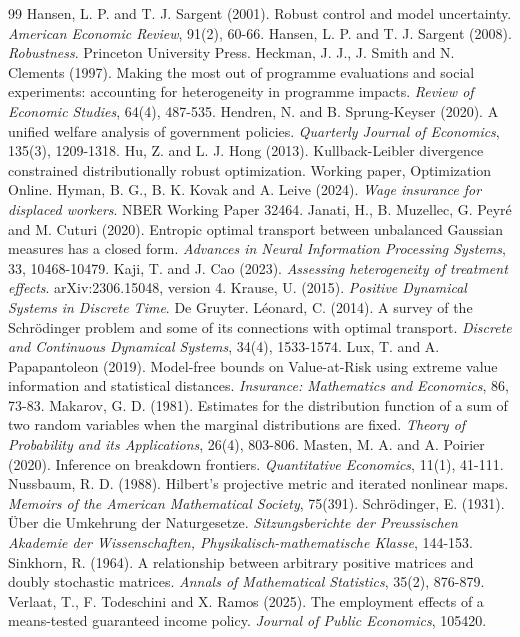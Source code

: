 \documentclass[11pt,a4paper]{article}
\theoremstyle{notesplain}
\theoremstyle{notesupright}
\numberwithin{equation}{section}
\begin{document}
\begin{thebibliography}{99}
 Hansen, L. P. and T. J. Sargent (2001). Robust control and model uncertainty. \emph{American Economic Review}, 91(2), 60-66.
 Hansen, L. P. and T. J. Sargent (2008). \emph{Robustness}. Princeton University Press.
 Heckman, J. J., J. Smith and N. Clements (1997). Making the most out of programme evaluations and social experiments: accounting for heterogeneity in programme impacts. \emph{Review of Economic Studies}, 64(4), 487-535.
 Hendren, N. and B. Sprung-Keyser (2020). A unified welfare analysis of government policies. \emph{Quarterly Journal of Economics}, 135(3), 1209-1318.
 Hu, Z. and L. J. Hong (2013). Kullback-Leibler divergence constrained distributionally robust optimization. Working paper, Optimization Online.
 Hyman, B. G., B. K. Kovak and A. Leive (2024). \emph{Wage insurance for displaced workers}. NBER Working Paper 32464.
 Janati, H., B. Muzellec, G. Peyré and M. Cuturi (2020). Entropic optimal transport between unbalanced Gaussian measures has a closed form. \emph{Advances in Neural Information Processing Systems}, 33, 10468-10479.
 Kaji, T. and J. Cao (2023). \emph{Assessing heterogeneity of treatment effects}. arXiv:2306.15048, version 4.
 Krause, U. (2015). \emph{Positive Dynamical Systems in Discrete Time}. De Gruyter.
 Léonard, C. (2014). A survey of the Schrödinger problem and some of its connections with optimal transport. \emph{Discrete and Continuous Dynamical Systems}, 34(4), 1533-1574.
 Lux, T. and A. Papapantoleon (2019). Model-free bounds on Value-at-Risk using extreme value information and statistical distances. \emph{Insurance: Mathematics and Economics}, 86, 73-83.
 Makarov, G. D. (1981). Estimates for the distribution function of a sum of two random variables when the marginal distributions are fixed. \emph{Theory of Probability and its Applications}, 26(4), 803-806.
 Masten, M. A. and A. Poirier (2020). Inference on breakdown frontiers. \emph{Quantitative Economics}, 11(1), 41-111.
 Nussbaum, R. D. (1988). Hilbert's projective metric and iterated nonlinear maps. \emph{Memoirs of the American Mathematical Society}, 75(391).
 Schrödinger, E. (1931). Über die Umkehrung der Naturgesetze. \emph{Sitzungsberichte der Preussischen Akademie der Wissenschaften, Physikalisch-mathematische Klasse}, 144-153.
 Sinkhorn, R. (1964). A relationship between arbitrary positive matrices and doubly stochastic matrices. \emph{Annals of Mathematical Statistics}, 35(2), 876-879.
 Verlaat, T., F. Todeschini and X. Ramos (2025). The employment effects of a means-tested guaranteed income policy. \emph{Journal of Public Economics}, 105420.
\end{thebibliography}
\end{document}
